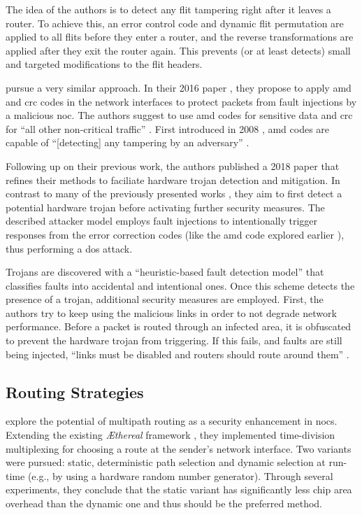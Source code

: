 The idea of the authors is to detect any flit tampering right after it leaves a router. To achieve this, an error control code and dynamic flit
permutation are applied to all flits before they enter a router, and the reverse transformations are applied after they exit the router again. This
prevents (or at least detects) small and targeted modifications to the flit headers.

\citeauthor{boraten16packetsecurity} pursue a very similar approach. In their 2016 paper \cite{boraten16packetsecurity}, they propose to apply
\gls{amd} and \gls{crc} codes in the network interfaces to protect packets from fault injections by a malicious \gls{noc}. The authors suggest to use
\gls{amd} codes for sensitive data and \gls{crc} for \enquote{all other non-critical traffic} \cite[2]{boraten16packetsecurity}. First introduced in 2008
\cite{cramer08amdcodes}, \gls{amd} codes are capable of \enquote{[detecting] any tampering by an adversary} \cite[1]{cramer08amdcodes}.

Following up on their previous work, the authors published a 2018 paper \cite{boraten18mitigationdos} that refines their methods to faciliate hardware
trojan detection and mitigation. In contrast to many of the previously presented works \cites(e.g.)(){ancajas14fortnocs}{frey17hardenednoc}, they aim
to first detect a potential hardware trojan before activating further security measures. The described attacker model employs fault injections to
intentionally trigger responses from the error correction codes (like the \gls{amd} code explored earlier \cite{boraten16packetsecurity}), thus
performing a \gls{dos} attack.

Trojans are discovered with a \enquote{heuristic-based fault detection model} \cite[25]{boraten18mitigationdos} that classifies faults into accidental
and intentional ones. Once this scheme detects the presence of a trojan, additional security measures are employed. First, the authors try to keep
using the malicious links in order to not degrade network performance. Before a packet is routed through an infected area, it is obfuscated to prevent
the hardware trojan from triggering. If this fails, and faults are still being injected, \enquote{links must be disabled and routers should route
around them} \cite[32]{boraten18mitigationdos}.

\subsection{Routing Strategies}
\citeauthor{stefan11enhancingnocs} \cite{stefan11enhancingnocs} explore the potential of multipath routing as a security enhancement in \glspl{noc}.
Extending the existing \textit{\AE thereal} framework \cite{goossens05aethereal}, they implemented time-division multiplexing for choosing a route at
the sender's network interface. Two variants were pursued: static, deterministic path selection and dynamic selection at run-time (e.g., by using a
hardware random number generator). Through several experiments, they conclude that the static variant has significantly less chip area overhead than
the dynamic one and thus should be the preferred method.


